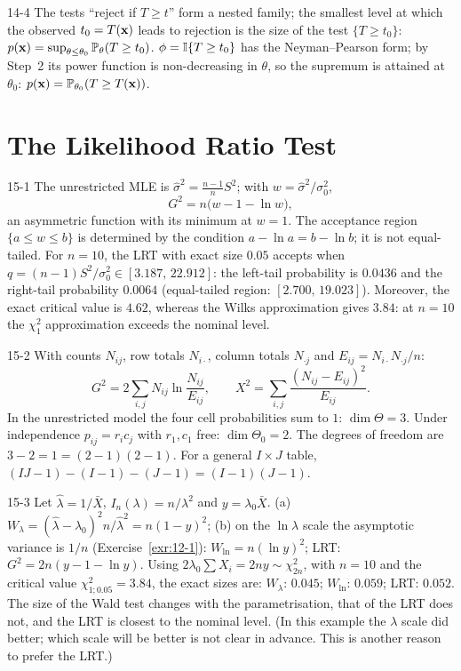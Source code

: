 \begin{solution}{14-4}
The tests ``reject if $T\ge t$'' form a nested family; the smallest level at which the observed $t_0=T(\mathbf{x})$ leads to rejection is the size of the test $\{T\ge t_0\}$: $p(\mathbf{x})=\sup_{\theta\le\theta_0}\mathbb{P}_\theta(T\ge t_0)$. $\phi=\mathbb{I}\{T\ge t_0\}$ has the Neyman--Pearson form; by Step~2 its power function is non-decreasing in $\theta$, so the supremum is attained at $\theta_0$: $p(\mathbf{x})=\mathbb{P}_{\theta_0}(T\ge T(\mathbf{x}))$.
\end{solution}

\section{The Likelihood Ratio Test}

\begin{solution}{15-1}
The unrestricted MLE is $\hat\sigma^2=\frac{n-1}{n}S^2$; with $w=\hat\sigma^2/\sigma_0^2$,
\[
G^2=n\big(w-1-\ln w\big),
\]
an asymmetric function with its minimum at $w=1$. The acceptance region $\{a\le w\le b\}$ is determined by the condition $a-\ln a=b-\ln b$; it is not equal-tailed. For $n=10$, the LRT with exact size $0.05$ accepts when $q=(n-1)S^2/\sigma_0^2\in[3.187,\,22.912]$: the left-tail probability is $0.0436$ and the right-tail probability $0.0064$ (equal-tailed region: $[2.700,\,19.023]$). Moreover, the exact critical value is $4.62$, whereas the Wilks approximation gives $3.84$: at $n=10$ the $\chi^2_1$ approximation exceeds the nominal level.
\end{solution}

\begin{solution}{15-2}
With counts $N_{ij}$, row totals $N_{i\cdot}$, column totals $N_{\cdot j}$ and $E_{ij}=N_{i\cdot}N_{\cdot j}/n$:
\[
G^2=2\sum_{i,j}N_{ij}\ln\frac{N_{ij}}{E_{ij}},\qquad X^2=\sum_{i,j}\frac{(N_{ij}-E_{ij})^2}{E_{ij}}.
\]
In the unrestricted model the four cell probabilities sum to $1$: $\dim\Theta=3$. Under independence $p_{ij}=r_ic_j$ with $r_1,c_1$ free: $\dim\Theta_0=2$. The degrees of freedom are $3-2=1=(2-1)(2-1)$. For a general $I\times J$ table, $(IJ-1)-(I-1)-(J-1)=(I-1)(J-1)$.
\end{solution}

\begin{solution}{15-3}
Let $\hat\lambda=1/\bar X$, $I_n(\lambda)=n/\lambda^2$ and $y=\lambda_0\bar X$.
(a) $W_\lambda=(\hat\lambda-\lambda_0)^2n/\hat\lambda^2=n(1-y)^2$;
(b) on the $\ln\lambda$ scale the asymptotic variance is $1/n$ (Exercise~\ref{exr:12-1}): $W_{\ln}=n(\ln y)^2$;
LRT: $G^2=2n(y-1-\ln y)$.
Using $2\lambda_0\sum X_i=2ny\sim\chi^2_{2n}$, with $n=10$ and the critical value $\chi^2_{1;0.05}=3.84$, the exact sizes are: $W_\lambda$: $0.045$; $W_{\ln}$: $0.059$; LRT: $0.052$. The size of the Wald test changes with the parametrisation, that of the LRT does not, and the LRT is closest to the nominal level. (In this example the $\lambda$ scale did better; which scale will be better is not clear in advance. This is another reason to prefer the LRT.)
\end{solution}

